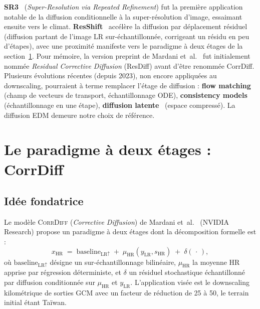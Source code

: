 \documentclass[14pt,a4paper,openany]{extreport}
\theoremstyle{definition}
\newcommand{\CorrDiff}{\textsc{CorrDiff}}
\newcommand{\LR}{\ensuremath{\text{LR}}}
\newcommand{\HR}{\ensuremath{\text{HR}}}
\newcommand{\xHR}{\ensuremath{x_{\HR}}}
\newcommand{\yLR}{\ensuremath{y_{\LR}}}
\newcommand{\muHR}{\ensuremath{\mu_{\HR}}}
\begin{document}
\textbf{SR3}~\cite{saharia_sr3_2022} (\emph{Super-Resolution via Repeated Refinement}) fut la première application notable de la diffusion conditionnelle à la super-résolution d'image, essaimant ensuite vers le climat. \textbf{ResShift}~\cite{yue_resshift_2023} accélère la diffusion par déplacement résiduel (diffusion partant de l'image LR sur-échantillonnée, corrigeant un résidu en peu d'étapes), avec une proximité manifeste vers le paradigme à deux étages de la section~\ref{sec:soa-corrdiff}. Pour mémoire, la version preprint de Mardani et~al.~\cite{mardani_corrdiff_2023} fut initialement nommée \emph{Residual Corrective Diffusion} (ResDiff) avant d'être renommée CorrDiff. Plusieurs évolutions récentes (depuis 2023), non encore appliquées au downscaling, pourraient à terme remplacer l'étage de diffusion : \textbf{flow matching}~\cite{lipman_flow_2023} (champ de vecteurs de transport, échantillonnage ODE), \textbf{consistency models}~\cite{song_consistency_2023} (échantillonnage en une étape), \textbf{diffusion latente}~\cite{rombach_latent_2022} (espace compressé). La diffusion EDM demeure notre choix de référence.\label{ssec:soa-flow-matching}

\section{Le paradigme à deux étages : CorrDiff}
\label{sec:soa-corrdiff}

\subsection{Idée fondatrice}
\label{ssec:soa-corrdiff-idee}

Le modèle \CorrDiff{} (\emph{Corrective Diffusion}) de Mardani et~al.~\cite{mardani_corrdiff_2023} (NVIDIA Research) propose un paradigme à deux étages dont la décomposition formelle est :
\begin{equation}
  \xHR \;=\; \mathrm{baseline}_{\LR \uparrow} \;+\; \muHR\!\left(\yLR, s_{\HR}\right) \;+\; \delta\!\left(\,\cdot\,\right),
  \label{eq:corrdiff}
\end{equation}
où $\mathrm{baseline}_{\LR \uparrow}$ désigne un sur-échantillonnage bilinéaire, $\muHR$ la moyenne HR apprise par régression déterministe, et $\delta$ un résiduel stochastique échantillonné par diffusion conditionnée sur $\muHR$ et $\yLR$. L'application visée est le downscaling kilométrique de sorties GCM avec un facteur de réduction de 25 à 50, le terrain initial étant Taïwan.
\end{document}

